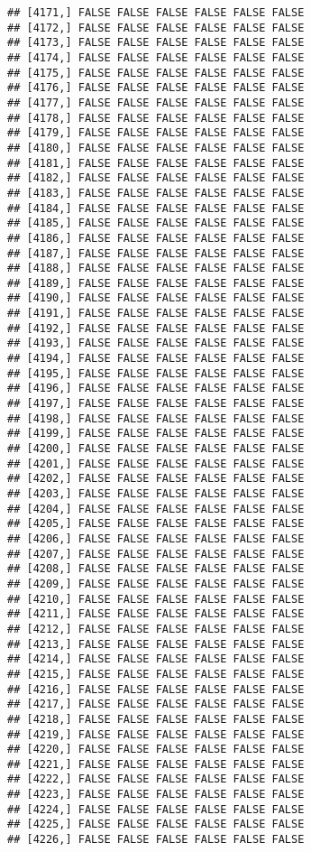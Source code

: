 \documentclass[
]{article}
\begin{document}
\begin{verbatim}
## [4171,] FALSE FALSE FALSE FALSE FALSE FALSE
## [4172,] FALSE FALSE FALSE FALSE FALSE FALSE
## [4173,] FALSE FALSE FALSE FALSE FALSE FALSE
## [4174,] FALSE FALSE FALSE FALSE FALSE FALSE
## [4175,] FALSE FALSE FALSE FALSE FALSE FALSE
## [4176,] FALSE FALSE FALSE FALSE FALSE FALSE
## [4177,] FALSE FALSE FALSE FALSE FALSE FALSE
## [4178,] FALSE FALSE FALSE FALSE FALSE FALSE
## [4179,] FALSE FALSE FALSE FALSE FALSE FALSE
## [4180,] FALSE FALSE FALSE FALSE FALSE FALSE
## [4181,] FALSE FALSE FALSE FALSE FALSE FALSE
## [4182,] FALSE FALSE FALSE FALSE FALSE FALSE
## [4183,] FALSE FALSE FALSE FALSE FALSE FALSE
## [4184,] FALSE FALSE FALSE FALSE FALSE FALSE
## [4185,] FALSE FALSE FALSE FALSE FALSE FALSE
## [4186,] FALSE FALSE FALSE FALSE FALSE FALSE
## [4187,] FALSE FALSE FALSE FALSE FALSE FALSE
## [4188,] FALSE FALSE FALSE FALSE FALSE FALSE
## [4189,] FALSE FALSE FALSE FALSE FALSE FALSE
## [4190,] FALSE FALSE FALSE FALSE FALSE FALSE
## [4191,] FALSE FALSE FALSE FALSE FALSE FALSE
## [4192,] FALSE FALSE FALSE FALSE FALSE FALSE
## [4193,] FALSE FALSE FALSE FALSE FALSE FALSE
## [4194,] FALSE FALSE FALSE FALSE FALSE FALSE
## [4195,] FALSE FALSE FALSE FALSE FALSE FALSE
## [4196,] FALSE FALSE FALSE FALSE FALSE FALSE
## [4197,] FALSE FALSE FALSE FALSE FALSE FALSE
## [4198,] FALSE FALSE FALSE FALSE FALSE FALSE
## [4199,] FALSE FALSE FALSE FALSE FALSE FALSE
## [4200,] FALSE FALSE FALSE FALSE FALSE FALSE
## [4201,] FALSE FALSE FALSE FALSE FALSE FALSE
## [4202,] FALSE FALSE FALSE FALSE FALSE FALSE
## [4203,] FALSE FALSE FALSE FALSE FALSE FALSE
## [4204,] FALSE FALSE FALSE FALSE FALSE FALSE
## [4205,] FALSE FALSE FALSE FALSE FALSE FALSE
## [4206,] FALSE FALSE FALSE FALSE FALSE FALSE
## [4207,] FALSE FALSE FALSE FALSE FALSE FALSE
## [4208,] FALSE FALSE FALSE FALSE FALSE FALSE
## [4209,] FALSE FALSE FALSE FALSE FALSE FALSE
## [4210,] FALSE FALSE FALSE FALSE FALSE FALSE
## [4211,] FALSE FALSE FALSE FALSE FALSE FALSE
## [4212,] FALSE FALSE FALSE FALSE FALSE FALSE
## [4213,] FALSE FALSE FALSE FALSE FALSE FALSE
## [4214,] FALSE FALSE FALSE FALSE FALSE FALSE
## [4215,] FALSE FALSE FALSE FALSE FALSE FALSE
## [4216,] FALSE FALSE FALSE FALSE FALSE FALSE
## [4217,] FALSE FALSE FALSE FALSE FALSE FALSE
## [4218,] FALSE FALSE FALSE FALSE FALSE FALSE
## [4219,] FALSE FALSE FALSE FALSE FALSE FALSE
## [4220,] FALSE FALSE FALSE FALSE FALSE FALSE
## [4221,] FALSE FALSE FALSE FALSE FALSE FALSE
## [4222,] FALSE FALSE FALSE FALSE FALSE FALSE
## [4223,] FALSE FALSE FALSE FALSE FALSE FALSE
## [4224,] FALSE FALSE FALSE FALSE FALSE FALSE
## [4225,] FALSE FALSE FALSE FALSE FALSE FALSE
## [4226,] FALSE FALSE FALSE FALSE FALSE FALSE

\end{verbatim}
\end{document}
